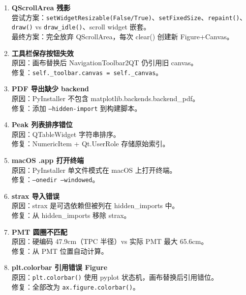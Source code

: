 \documentclass[12pt,a4paper]{article}
\begin{document}
\begin{enumerate}[itemsep=5pt]

\item \textbf{QScrollArea 残影} \\
尝试方案：\texttt{setWidgetResizable(False/True)}、\texttt{setFixedSize}、\texttt{repaint()}、\texttt{draw()} vs \texttt{draw\_idle()}、scroll widget 嵌套。\\
最终方案：完全放弃 QScrollArea，每次 clear() 创建新 Figure+Canvas。

\item \textbf{工具栏保存按钮失效} \\
原因：画布替换后 NavigationToolbar2QT 仍引用旧 canvas。\\
修复：\texttt{self.\_toolbar.canvas = self.\_canvas}。

\item \textbf{PDF 导出缺少 backend} \\
原因：PyInstaller 不包含 matplotlib.backends.backend\_pdf。\\
修复：添加 \texttt{--hidden-import} 到构建脚本。

\item \textbf{Peak 列表排序错位} \\
原因：QTableWidget 字符串排序。\\
修复：NumericItem + Qt.UserRole 存储原始索引。

\item \textbf{macOS .app 打开终端} \\
原因：PyInstaller 单文件模式在 macOS 上打开终端。\\
修复：\texttt{--onedir --windowed}。

\item \textbf{strax 导入错误} \\
原因：strax 是可选依赖但被列在 hidden\_imports 中。\\
修复：从 hidden\_imports 移除 strax。

\item \textbf{PMT 圆圈不匹配} \\
原因：硬编码 47.9cm（TPC 半径）vs 实际 PMT 最大 65.6cm。\\
修复：从 PMT 位置自动计算。

\item \textbf{plt.colorbar 引用错误 Figure} \\
原因：\texttt{plt.colorbar()} 使用 pyplot 状态机，画布替换后引用错位。\\
修复：全部改为 \texttt{ax.figure.colorbar()}。


\end{enumerate}
\end{document}
